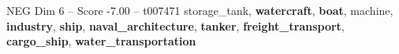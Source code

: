 \begin{textsample}{NEG Dim 6 – Score -7.00 – t007471}  \label{ex:f6_neg_026}
storage\_tank, \textbf{watercraft}, \textbf{boat}, machine, \textbf{industry}, \textbf{ship}, \textbf{naval\_architecture}, \textbf{tanker}, \textbf{freight\_transport}, \textbf{cargo\_ship}, \textbf{water\_transportation}

\end{textsample}
